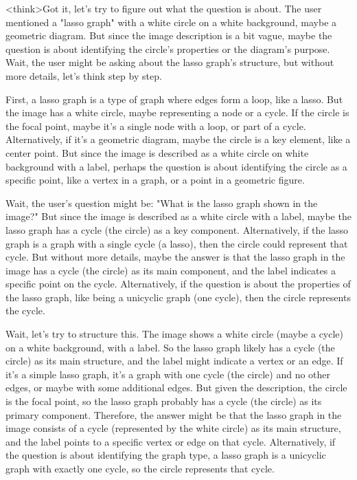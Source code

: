 <think>Got it, let's try to figure out what the question is about. The user mentioned a "lasso graph" with a white circle on a white background, maybe a geometric diagram. But since the image description is a bit vague, maybe the question is about identifying the circle's properties or the diagram's purpose. Wait, the user might be asking about the lasso graph's structure, but without more details, let's think step by step.

First, a lasso graph is a type of graph where edges form a loop, like a lasso. But the image has a white circle, maybe representing a node or a cycle. If the circle is the focal point, maybe it's a single node with a loop, or part of a cycle. Alternatively, if it's a geometric diagram, maybe the circle is a key element, like a center point. But since the image is described as a white circle on white background with a label, perhaps the question is about identifying the circle as a specific point, like a vertex in a graph, or a point in a geometric figure.

Wait, the user's question might be: "What is the lasso graph shown in the image?" But since the image is described as a white circle with a label, maybe the lasso graph has a cycle (the circle) as a key component. Alternatively, if the lasso graph is a graph with a single cycle (a lasso), then the circle could represent that cycle. But without more details, maybe the answer is that the lasso graph in the image has a cycle (the circle) as its main component, and the label indicates a specific point on the cycle. Alternatively, if the question is about the properties of the lasso graph, like being a unicyclic graph (one cycle), then the circle represents the cycle.

Wait, let's try to structure this. The image shows a white circle (maybe a cycle) on a white background, with a label. So the lasso graph likely has a cycle (the circle) as its main structure, and the label might indicate a vertex or an edge. If it's a simple lasso graph, it's a graph with one cycle (the circle) and no other edges, or maybe with some additional edges. But given the description, the circle is the focal point, so the lasso graph probably has a cycle (the circle) as its primary component. Therefore, the answer might be that the lasso graph in the image consists of a cycle (represented by the white circle) as its main structure, and the label points to a specific vertex or edge on that cycle. Alternatively, if the question is about identifying the graph type, a lasso graph is a unicyclic graph with exactly one cycle, so the circle represents that cycle.

